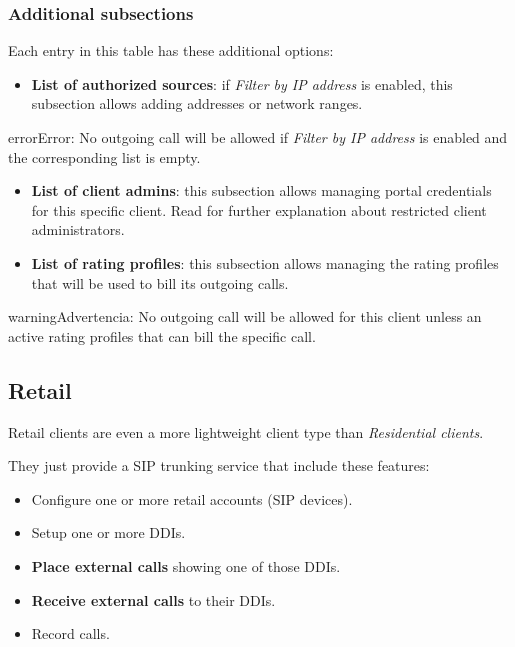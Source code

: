 \documentclass[letterpaper,10pt,spanish]{sphinxmanual}
\begin{document}
\subsubsection{Additional subsections}
\label{administration_portal/brand/clients/residential:additional-subsections}
Each entry in this table has these additional options:
\begin{itemize}
\item {} 
\textbf{List of authorized sources}: if \emph{Filter by IP address} is enabled, this subsection allows adding addresses or network ranges.

\end{itemize}

\begin{notice}{error}{Error:}
No outgoing call will be allowed if \emph{Filter by IP address} is enabled and the corresponding list is empty.
\end{notice}
\begin{itemize}
\item {} 
\textbf{List of client admins}: this subsection allows managing portal credentials for this specific client. Read {\hyperref[api_rest/acls:acls]{}}
for further explanation about restricted client administrators.

\item {} 
\textbf{List of rating profiles}: this subsection allows managing the rating profiles that will be used to bill its outgoing calls.

\end{itemize}

\begin{notice}{warning}{Advertencia:}
No outgoing call will be allowed for this client unless an active rating profiles that can
bill the specific call.
\end{notice}


\subsection{Retail}
\label{administration_portal/brand/clients/retail:retail-clients}\label{administration_portal/brand/clients/retail:retail}\label{administration_portal/brand/clients/retail::doc}
Retail clients are even a more lightweight client type than \emph{Residential clients}.

They just provide a SIP trunking service that include these features:
\begin{itemize}
\item {} 
Configure one or more retail accounts (SIP devices).

\item {} 
Setup one or more DDIs.

\item {} 
\textbf{Place external calls} showing one of those DDIs.

\item {} 
\textbf{Receive external calls} to their DDIs.

\item {} 
Record calls.

\end{itemize}
\end{document}
